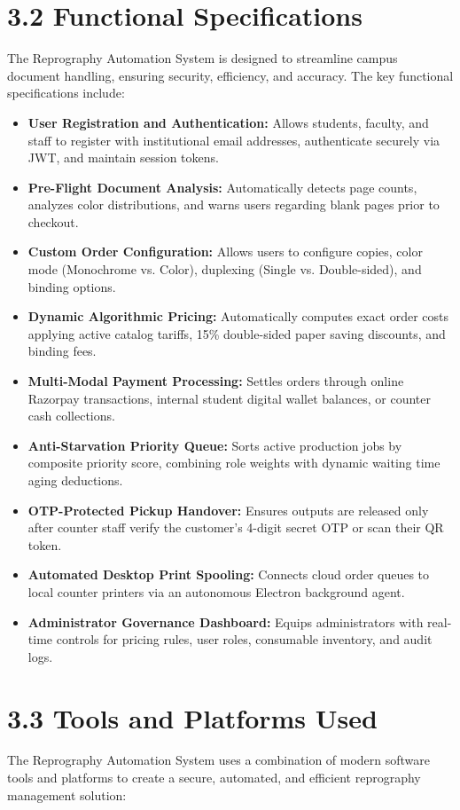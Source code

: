 \documentclass[12pt,a4paper]{report}
\begin{document}
\section{3.2 Functional Specifications}
The Reprography Automation System is designed to streamline campus document handling, ensuring security, efficiency, and accuracy. The key functional specifications include:
\begin{itemize}[leftmargin=0.35in, itemsep=2pt]
  \item \textbf{User Registration and Authentication:} Allows students, faculty, and staff to register with institutional email addresses, authenticate securely via JWT, and maintain session tokens.
  \item \textbf{Pre-Flight Document Analysis:} Automatically detects page counts, analyzes color distributions, and warns users regarding blank pages prior to checkout.
  \item \textbf{Custom Order Configuration:} Allows users to configure copies, color mode (Monochrome vs. Color), duplexing (Single vs. Double-sided), and binding options.
  \item \textbf{Dynamic Algorithmic Pricing:} Automatically computes exact order costs applying active catalog tariffs, 15\% double-sided paper saving discounts, and binding fees.
  \item \textbf{Multi-Modal Payment Processing:} Settles orders through online Razorpay transactions, internal student digital wallet balances, or counter cash collections.
  \item \textbf{Anti-Starvation Priority Queue:} Sorts active production jobs by composite priority score, combining role weights with dynamic waiting time aging deductions.
  \item \textbf{OTP-Protected Pickup Handover:} Ensures outputs are released only after counter staff verify the customer's 4-digit secret OTP or scan their QR token.
  \item \textbf{Automated Desktop Print Spooling:} Connects cloud order queues to local counter printers via an autonomous Electron background agent.
  \item \textbf{Administrator Governance Dashboard:} Equips administrators with real-time controls for pricing rules, user roles, consumable inventory, and audit logs.
\end{itemize}

\section{3.3 Tools and Platforms Used}
The Reprography Automation System uses a combination of modern software tools and platforms to create a secure, automated, and efficient reprography management solution:
\end{document}
